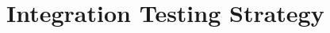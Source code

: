 \documentclass[../../../../testPlan.tex]{subfiles}
\begin{document}
	\section{Integration Testing Strategy}
\end{document}
